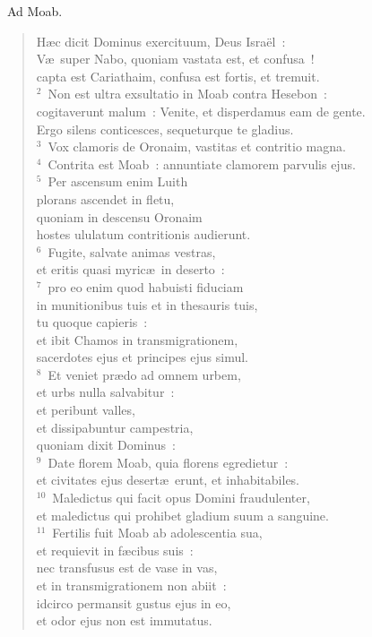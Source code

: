 ~Ad Moab. \begin{flushleft}\begin{verse}\vspace{6pt}H\ae c dicit Dominus exercituum, Deus Isra\"el~:\\ V\ae\ super Nabo, quoniam vastata est, et confusa~!\\ capta est Cariathaim, confusa est fortis, et tremuit.\\
${}^{2}$~Non est ultra exsultatio in Moab contra Hesebon~:\\ cogitaverunt malum~: Venite, et disperdamus eam de gente.\\ Ergo silens conticesces, sequeturque te gladius.\\
${}^{3}$~Vox clamoris de Oronaim, vastitas et contritio magna.\\
${}^{4}$~Contrita est Moab~: annuntiate clamorem parvulis ejus.\\
${}^{5}$~Per ascensum enim Luith\\ plorans ascendet in fletu,\\ quoniam in descensu Oronaim\\ hostes ululatum contritionis audierunt.\\
${}^{6}$~Fugite, salvate animas vestras,\\ et eritis quasi myric\ae\ in deserto~:\\
${}^{7}$~pro eo enim quod habuisti fiduciam\\ in munitionibus tuis et in thesauris tuis,\\ tu quoque capieris~:\\ et ibit Chamos in transmigrationem,\\ sacerdotes ejus et principes ejus simul.\\
${}^{8}$~Et veniet pr\ae do ad omnem urbem,\\ et urbs nulla salvabitur~:\\ et peribunt valles,\\ et dissipabuntur campestria,\\ quoniam dixit Dominus~:\\
${}^{9}$~Date florem Moab, quia florens egredietur~:\\ et civitates ejus desert\ae\ erunt, et inhabitabiles.\\
${}^{10}$~Maledictus qui facit opus Domini fraudulenter,\\ et maledictus qui prohibet gladium suum a sanguine.\\
${}^{11}$~Fertilis fuit Moab ab adolescentia sua,\\ et requievit in f\ae cibus suis~:\\ nec transfusus est de vase in vas,\\ et in transmigrationem non abiit~:\\ idcirco permansit gustus ejus in eo,\\ et odor ejus non est immutatus.\\

\end{verse}
\end{flushleft}
